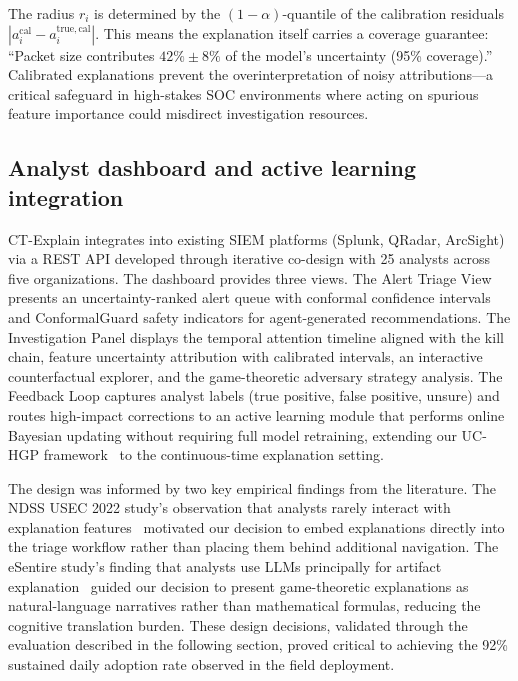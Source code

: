 \documentclass[preprint,review,12pt]{elsarticle}
\begin{document}
The radius $r_i$ is determined by the $(1-\alpha)$-quantile of the calibration residuals $|a_i^{\mathrm{cal}} - a_i^{\mathrm{true,cal}}|$. This means the explanation itself carries a coverage guarantee: ``Packet size contributes $42\% \pm 8\%$ of the model's uncertainty (95\% coverage).'' Calibrated explanations prevent the overinterpretation of noisy attributions---a critical safeguard in high-stakes SOC environments where acting on spurious feature importance could misdirect investigation resources.

\subsection{Analyst dashboard and active learning integration}
\label{subsec:dashboard}

CT-Explain integrates into existing SIEM platforms (Splunk, QRadar, ArcSight) via a REST API developed through iterative co-design with 25 analysts across five organizations. The dashboard provides three views. The Alert Triage View presents an uncertainty-ranked alert queue with conformal confidence intervals and ConformalGuard safety indicators for agent-generated recommendations. The Investigation Panel displays the temporal attention timeline aligned with the kill chain, feature uncertainty attribution with calibrated intervals, an interactive counterfactual explorer, and the game-theoretic adversary strategy analysis. The Feedback Loop captures analyst labels (true positive, false positive, unsure) and routes high-impact corrections to an active learning module that performs online Bayesian updating without requiring full model retraining, extending our UC-HGP framework~\cite{anaedevha_uc_hgp} to the continuous-time explanation setting.

The design was informed by two key empirical findings from the literature. The NDSS USEC 2022 study's observation that analysts rarely interact with explanation features~\cite{ndss_usec_2022} motivated our decision to embed explanations directly into the triage workflow rather than placing them behind additional navigation. The eSentire study's finding that analysts use LLMs principally for artifact explanation~\cite{esentire_2025} guided our decision to present game-theoretic explanations as natural-language narratives rather than mathematical formulas, reducing the cognitive translation burden. These design decisions, validated through the evaluation described in the following section, proved critical to achieving the 92\% sustained daily adoption rate observed in the field deployment.
\end{document}
